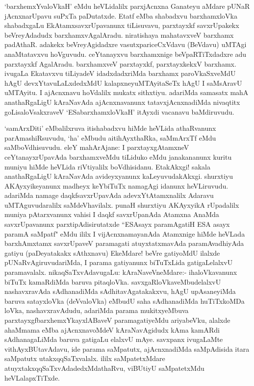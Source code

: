 \begin{artha}%
`barxhemxYvaloVkaH' eMdu heVLidalilx parxjAcnxna Ganateyu aMdare pUNaR jAcnxnarUpavu suPxTa paDutatxde. Etatf eMba shabadxvu barxhamxloVka shabadxgaLu EkAtamxsavxrUpavanunx tiLisuvavu, parxtayxkf savxrUpakekx beVreyAdadudx barxhamxvAgalAradu. niratishaya mahatavxveV barxhamx padAthaR. adakekx beVreyAgidadxre vasutxpariceCxVdavu (BeVdavu) uMTAgi anaMtatavxvu hoVguvudu. ceYtanayxvu barxhamxnige beVpaRTiTxdadxre adu parxtayxkf AgalAradu. barxhamxveV parxtayxkf, parxtayxkekxV barxhamx. ivugaLa Ekatavxvu tiLiyadeV idadxdadxriMda barxhamx paroVkaSxveMdU hAgU devxYtavuLaLxdedxMdU kalapxneyuMTAyitaSeTx hAgU I saMsAravU uMTAyitu. I ajAcnxnavu hoVdalilx mukatx sithxtiyu. adariMda samasatx mahA anathaRgaLigU kAraNavAda ajAcnxnavanunx tatavxjAcnxnadiMda nivaqtitx goLisaloVsakxraveV `ESabarxhamxloVkaH' itAyxdi vacanavu baMdiruvudu. 
\end{artha}

\begin{artha}
`samArxDiti' eMbalilxruva itishabadxvu hiMde heVLida athaRvanunx parAmashiRsuvudu, `ha' eMbudu aitihAyxthaRka, saMmArxTf eMdu saMboVdhisuvudu. eleY mahArAjane: I parxtayxgAtamxneV ceYtanayxrUpavAda barxhamxveMdu tiLiduko eMdu janakananunx kuritu muniyu hiMde heVLida riVtiyalilx boVdhisidanu. EtakAkxgi! sakala anathaRgaLigU kAraNavAda avideyxyanunx kaLeyuvudakAkxgi. shurxtiyu AKAyxyikeyanunx madheyx keYbiTuTx namagAgi idanunx heVLiruvudu. adariMda namage daqkfsavxrUpavAda adevxYtAtamxnalilx Adaravu uMTAguvudaralilx saMdeVhavilalx. punaH shurxtiyu AKAyxyikA rUpadalilx muniya pAtarxvanunx vahisi I daqkf savxrUpanAda Atamxna AnaMda savxrUpavanunx parxtipAdisirutatxde ``ESAsayx paramAgatiH ESA asayx paramA saMpatf" eMdu ililx I vijAcnxnamayanAda Atamxnige hiMde heVLada barxhAmxtamx savxrUpaveV paramagati atuyxtatxmavAda paramAvadhiyAda gatiyu (paDeyatakakx sAthxnavu) EkeMdare! beVre gatiyoMdU ilalxde pUNaRvAgiruvudariMda, I parama gatiyanunx biTuTxLida gatigaLelalxvU paramavalalx. nikaqSaTxvAdavugaLu: kAraNaveVneMdare:- ihaloVkavanunx biTuTx kamaRdiMda baruva pitaqloVka. savxgaRloVkaveMbudelalxvU nashavxravAda sAdhanadiMda sAdhitavAgatakakxvu, hAgU upAsaneyiMda baruva satayxloVka (deVvaloVka) eMbudU saha sAdhanadiMda huTiTxkoMDa loVka, nashavxravAdudu, adariMda parama mukitxyeMbuva parxtayxgfbarxhemxYkayxlABaveV paramagatiyeMdu ariyabeVku, alalxde ahaMmama eMba ajAcnxnavoMdeV kAraNavAgidudx kAma kamARdi sAdhanagaLiMda baruva gatigaLu elalxvU mAye. savxpanx ivugaLaMte vithAyxBUtavAdavu, ide parama saMpatutx, ajAcnxnadiMda saMpAdisida itara saMpatutx utakxqqSaTxvalalx. ililx saMpatetxMdare atuyxtakxqqSaTxvAdadedxMdathaRvu, viBUtiyU saMpatetxMdu heVLalapxTiTxde. 
\end{artha}%

